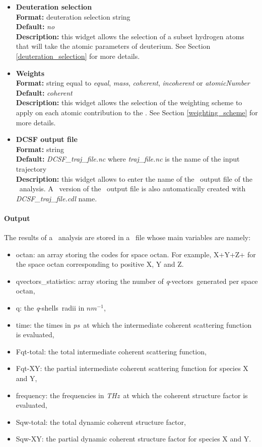 \documentclass[a4paper,11pt]{report}
\newcommand{\ps}{\textit{ps}}
\newcommand{\invnm}{$nm^{-1}$}
\newcommand{\thz}{\textit{THz}}
\newcommand{\qvects}{\textit{q}-vectors}
\newcommand{\qshells}{\textit{q}-shells}
\begin{document}
\begin{itemize}
\item \textbf{Deuteration selection}\\
\textbf{Format:} deuteration selection string\\
\textbf{Default:} \textit{no}\\
\textbf{Description:} this widget allows the selection of a subset hydrogen atoms that will take the atomic parameters 
of deuterium. See Section \ref{deuteration_selection} for more details.

\item \textbf{Weights}\\
\textbf{Format:} string equal to \textit{equal}, \textit{mass}, \textit{coherent}, \textit{incoherent} or \textit{atomicNumber}\\
\textbf{Default:} \textit{coherent}\\
\textbf{Description:} this widget allows the selection of the weighting scheme to apply on each atomic contribution 
to the \DCSF . See Section \ref{weighting_scheme} for more details. 

\item \textbf{DCSF output file}\\
\textbf{Format:} string\\
\textbf{Default:} \textit{DCSF\_traj\_file.nc} where \textit{traj\_file.nc} is the name of the input trajectory\\
\textbf{Description:} this widget allows to enter the name of the \NetCDF\ output file of the \DCSF\ analysis. A \CDL\ 
version of the \NetCDF\ output file is also automatically created with \textit{DCSF\_traj\_file.cdl} name.
\end{itemize}

\paragraph{Output\\}
The results of a \DCSF\ analysis are stored in a \NetCDF\ file whose main variables are namely:
\begin{itemize}
\item octan: an array storing the codes for space octan. For example, X+Y+Z+ for the space octan corresponding to positive
X, Y and Z.
\item qvectors\_statistics: array storing the number of \qvects\ generated per space octan,
\item q: the \qshells\ radii in \invnm ,
\item time: the times in \ps\ at which the intermediate coherent scattering function is evaluated,
\item Fqt-total: the total intermediate coherent scattering function,
\item Fqt-XY: the partial intermediate coherent scattering function for species X and Y,
\item frequency: the frequencies in \thz\ at which the coherent structure factor is evaluated,
\item Sqw-total: the total dynamic coherent structure factor,
\item Sqw-XY: the partial dynamic coherent structure factor for species X and Y.
\end{itemize}
\end{document}
